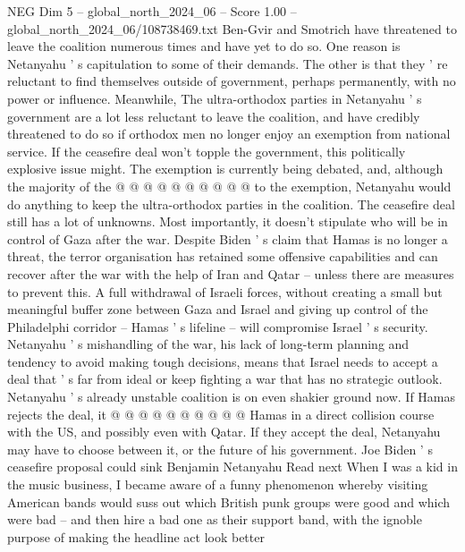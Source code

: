 \begin{textsample}{NEG Dim 5 – global\_north\_2024\_06 – Score 1.00 – global\_north\_2024\_06/108738469.txt}
Ben-Gvir and Smotrich have threatened to leave the coalition numerous times and have yet to do so.
One reason is Netanyahu ' s capitulation to some of their demands.
The other is that they ' re reluctant to find themselves outside of government, perhaps permanently, with no power or influence.
Meanwhile, The ultra-orthodox parties in Netanyahu ' s government are a lot less reluctant to leave the coalition, and have credibly threatened to do so if orthodox men no longer enjoy an exemption from national service.
If the ceasefire deal won't topple the government, this politically explosive issue might.
The exemption is currently being debated, and, although the majority of the @ @ @ @ @ @ @ @ @ @ to the exemption, Netanyahu would do anything to keep the ultra-orthodox parties in the coalition.
The ceasefire deal still has a lot of unknowns.
Most importantly, it doesn't stipulate who will be in control of Gaza after the war.
Despite Biden ' s claim that Hamas is no longer a threat, the terror organisation has retained some offensive capabilities and can recover after the war with the help of Iran and Qatar -- unless there are measures to prevent this.
A full withdrawal of Israeli forces, without creating a small but meaningful buffer zone between Gaza and Israel and giving up control of the Philadelphi corridor -- Hamas ' s lifeline -- will compromise Israel ' s security.
Netanyahu ' s mishandling of the war, his lack of long-term planning and tendency to avoid making tough decisions, means that Israel needs to accept a deal that ' s far from ideal or keep fighting a war that has no strategic outlook.
Netanyahu ' s already unstable coalition is on even shakier ground now.
If Hamas rejects the deal, it @ @ @ @ @ @ @ @ @ @ Hamas in a direct collision course with the US, and possibly even with Qatar.
If they accept the deal, Netanyahu may have to choose between it, or the future of his government.
Joe Biden ' s ceasefire proposal could sink Benjamin Netanyahu Read next When I was a kid in the music business, I became aware of a funny phenomenon whereby visiting American bands would suss out which British punk groups were good and which were bad -- and then hire a bad one as their support band, with the ignoble purpose of making the headline act look better

\end{textsample}

